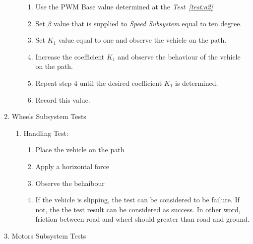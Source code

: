 \documentclass[a4paper,12pt]{article}
\begin{document}
\begin{enumerate}
\begin{enumerate}
\begin{enumerate}
\item Use the PWM Base value determined at the \textit{Test~\ref{test:a2}}

\item Set $\beta$ value that is supplied to \textit{Speed Subsystem} equal to ten degree.

\item Set $K_1$ value equal to one and observe the vehicle on the path.

\item Increase the coefficient $K_1$ and observe the behaviour of the vehicle on the path.

\item Repeat step 4 until the desired coefficient $K_1$ is determined.

\item Record this value.

\end{enumerate}



\end{enumerate}







\item Wheels Subsystem Tests


\begin{enumerate}

\item {Handling Test:} 

\begin{enumerate}

\item  Place the vehicle on the path

\item Apply a horizontal force

\item Observe the behaibour 

\item If the vehicle is slipping, the test can be considered to be failure. If not, the the test result can be considered as success. In other word, friction between road and wheel should greater than road and ground. 


\end{enumerate}

\end{enumerate}


\item Motors Subsystem Tests



\end{enumerate}
\end{document}
